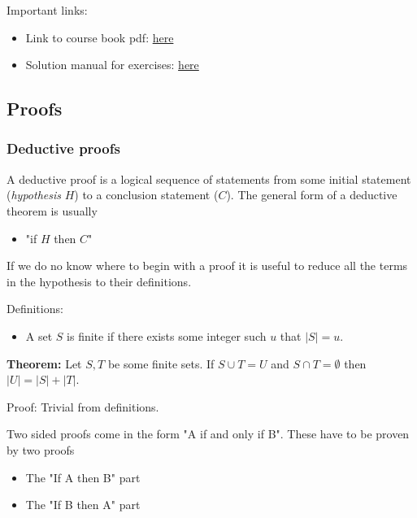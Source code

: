 
Important links: 
\begin{itemize}
    \item Link to course book pdf: \href{https://dpvipracollege.ac.in/wp-content/uploads/2023/01/John-E.-Hopcroft-Rajeev-Motwani-Jeffrey-D.-Ullman-Introduction-to-Automata-Theory-Languages-and-Computations-Prentice-Hall-2006.pdf}{here}
    \item Solution manual for exercises: \href{http://infolab.stanford.edu/~ullman/ialc.html#solutions}{here}
\end{itemize}

\subsection{Proofs}

\subsubsection{Deductive proofs} 
A deductive proof is a logical sequence of statements from some initial statement (\textit{hypothesis} $H$) to a conclusion statement ($C$). The general form of a deductive theorem is usually 
\begin{itemize}
    \item "if $H$ then $C$"
\end{itemize}

If we do no know where to begin with a proof it is useful to reduce all the terms in the hypothesis to their definitions. 
\begin{example} 
    Definitions: 
    \begin{itemize}
        \item A set $S$ is finite if there exists some integer such $u$ that $|S| = u$.
    \end{itemize}
    
    \textbf{Theorem:} Let $S,T$ be some finite sets. If $S \cup T = U$ and $S \cap T = \emptyset$ then $|U| = |S| + |T|$.

    Proof: Trivial from definitions.
\end{example}

Two sided proofs come in the form "A if and only if B". These have to be proven by two proofs 
\begin{itemize}
    \item The "If A then B" part 
    \item The "If B then A" part
\end{itemize}

